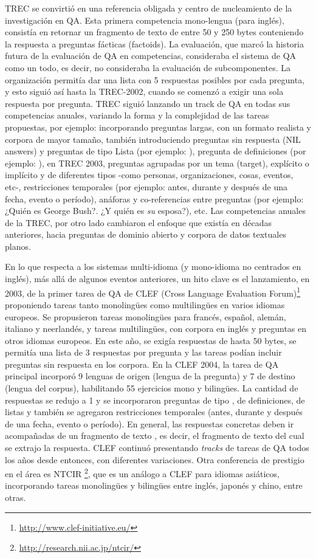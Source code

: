 TREC se convirtió en una referencia obligada y centro de nucleamiento de la investigación en QA. Esta primera competencia mono-lengua (para inglés), consistía en retornar un fragmento de texto de entre 50 y 250 bytes conteniendo la respuesta a preguntas fácticas (factoids). La evaluación, que marcó la historia futura de la evaluación de QA en competencias, consideraba el sistema de QA como un todo, es decir, no consideraba la evaluación de subcomponentes. La organización permitía dar una lista con 5 respuestas posibles por cada pregunta, y esto siguió así hasta la TREC-2002, cuando se comenzó a exigir una sola respuesta por pregunta. TREC siguió lanzando un track de QA en todas sus competencias anuales, variando la forma y la complejidad de las tareas propuestas, por ejemplo: incorporando preguntas largas, con un formato realista y corpora de mayor tamaño, también introduciendo preguntas sin respuesta (NIL answers) y preguntas de tipo Lista (por ejemplo: ), pregunta de definiciones (por ejemplo: ), en TREC 2003, preguntas agrupadas por un tema (target), explícito o implícito y de diferentes tipos -como personas, organizaciones, cosas, eventos, etc-, restricciones temporales (por ejemplo: antes, durante y después de una fecha, evento o período), anáforas y co-referencias entre preguntas (por ejemplo: ¿Quién es George Bush?. ¿Y quién es \textit{su} esposa?), etc. Las competencias anuales de la TREC, por otro lado cambiaron el enfoque que existía en décadas anteriores, hacia preguntas de dominio abierto y corpora de datos textuales planos.

En lo que respecta a los sistemas multi-idioma (y mono-idioma no centrados en inglés), más allá de algunos eventos anteriores, un hito clave es el lanzamiento, en 2003, de la primer tarea de QA \cite{CLEF03} de CLEF (Cross Language Evaluation Forum)\footnote{\url{http://www.clef-initiative.eu/}} proponiendo tareas tanto monolingües como multilingües en varios idiomas europeos. Se propusieron tareas monolingües para francés, español, alemán, italiano y neerlandés, y tareas multilingües, con corpora en inglés y preguntas en otros idiomas europeos. En este año, se exigía respuestas de hasta 50 bytes, se permitía una lista de 3 respuestas por pregunta y las tareas podían incluir preguntas sin respuesta en los corpora. En la CLEF 2004, la tarea de QA principal incorporó 9 lenguas de origen (lengua de la pregunta) y 7 de destino (lengua del corpus), habilitando 55 ejercicios mono y bilingües. La cantidad de respuestas se redujo a 1 y se incorporaron preguntas de tipo , de definiciones, de listas y también se agregaron restricciones temporales (antes, durante y después de una fecha, evento o período). En general, las respuestas concretas deben ir acompañadas de un fragmento de texto , es decir, el fragmento de texto del cual se extrajo la respuesta. CLEF continuó presentando {\em tracks} de tareas de QA todos los años desde entonces, con diferentes variaciones. Otra conferencia de prestigio en el área es NTCIR \footnote{\url{http://research.nii.ac.jp/ntcir/}}, que es un análogo a CLEF para idiomas asiáticos, incorporando tareas monolingües y bilingües entre inglés, japonés y chino, entre otras.

